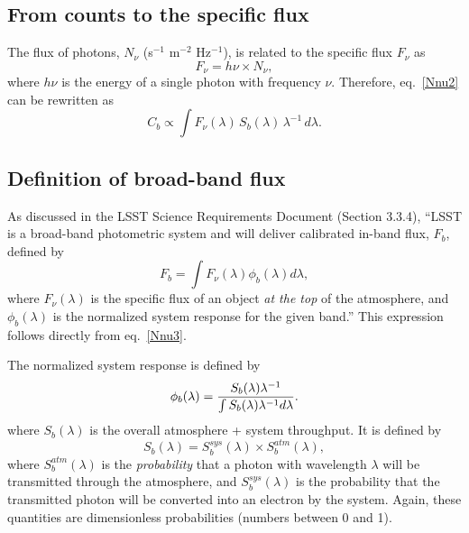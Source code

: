 \documentclass{emulateapj}
\begin{document}
\subsection{From counts to the specific flux} 

The flux of photons, $N_\nu$ (s$^{-1}$ m$^{-2}$ Hz$^{-1}$), is related to the specific flux $F_\nu$ as
\begin{equation}
\label{FNnu}
                 F_\nu = h \nu \times N_\nu,  
\end{equation}
where $h\nu$ is the energy of a single photon with frequency $\nu$. Therefore,
eq.~\ref{Nnu2} can be rewritten as
\begin{equation}
\label{Nnu3}
         C_b\propto \int F_\nu(\lambda) \, S_b(\lambda) \, \lambda^{-1} \, d\lambda. 
\end{equation}


\subsection{Definition of broad-band flux} 

As discussed in the LSST Science Requirements Document (Section 3.3.4), ``LSST is a 
broad-band photometric system and will deliver calibrated in-band flux, $F_b$, 
defined by 
\begin{equation}
\label{Fb}
              F_b = \int{F_\nu(\lambda) \phi_b(\lambda) d\lambda},
\end{equation}
where $F_\nu(\lambda)$ is the specific flux of an object {\it at the top} of the atmosphere, 
and $\phi_b(\lambda)$ is the normalized system response for the given band.'' This
expression follows directly from eq.~\ref{Nnu3}. 

The normalized system response is defined by 
\begin{equation}
\label{PhiDef}
\phi_b(\lambda) = {S_b(\lambda) \lambda^{-1} \over \int{S_b(\lambda) \lambda^{-1} d\lambda}}.
\end{equation}
where $S_b(\lambda)$ is the overall atmosphere + system throughput.  It is defined by
\begin{equation}
\label{SDef}
         S_b(\lambda) = S_b^{sys}(\lambda) \times S_b^{atm}(\lambda),
\end{equation}
where $S_b^{atm}(\lambda)$ is the {\it probability} that a photon 
with wavelength $\lambda$ will be transmitted through the atmosphere, and
$S_b^{sys}(\lambda)$ is the probability that the transmitted photon will be 
converted into an electron by the system. Again, these quantities are
dimensionless probabilities (numbers between 0 and 1). 
\end{document}
